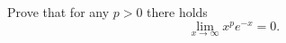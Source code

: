 \begin{exercise}
  \label{ex:hw06:exponential-dominates-powers}
  Prove that for any $p>0$ there holds
  \[
    \lim_{x\to\infty}x^p e^{-x}=0.
  \]
\end{exercise}
